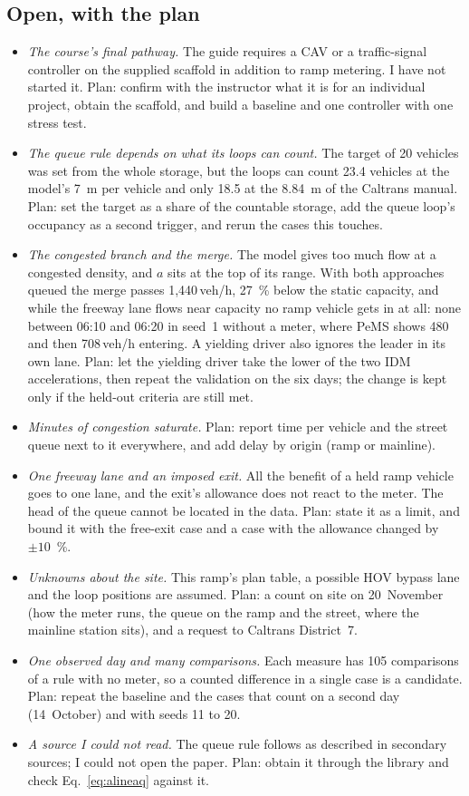 \documentclass[11pt,letterpaper]{article}
\newcommand{\vehh}{\,veh/h}
\begin{document}
\subsection{Open, with the plan}\label{sec:open}
\begin{itemize}
\item \emph{The course's final pathway.} The guide requires a CAV or a traffic-signal
  controller on the supplied scaffold in addition to ramp metering. I have not started
  it. Plan: confirm with the instructor what it is for an individual project, obtain the
  scaffold, and build a baseline and one controller with one stress test.
\item \emph{The queue rule depends on what its loops can count.} The target of 20
  vehicles was set from the whole storage, but the loops can count 23.4 vehicles at the
  model's 7~m per vehicle and only 18.5 at the 8.84~m of the Caltrans manual. Plan: set
  the target as a share of the countable storage, add the queue loop's occupancy as a
  second trigger, and rerun the cases this touches.
\item \emph{The congested branch and the merge.} The model gives too much flow at a
  congested density, and $a$ sits at the top of its range. With both approaches queued
  the merge passes 1{,}440\vehh{}, 27~\% below the static capacity, and while the
  freeway lane flows near capacity no ramp vehicle gets in at all: none between 06:10
  and 06:20 in seed~1 without a meter, where PeMS shows 480 and then 708\vehh{} entering.
  A yielding driver also ignores the leader in its own lane. Plan: let the yielding driver take the lower of the two IDM
  accelerations, then repeat the validation on the six days; the change is kept only if
  the held-out criteria are still met.
\item \emph{Minutes of congestion saturate.} Plan: report time per vehicle and the
  street queue next to it everywhere, and add delay by origin (ramp or mainline).
\item \emph{One freeway lane and an imposed exit.} All the benefit of a held ramp
  vehicle goes to one lane, and the exit's allowance does not react to the meter. The
  head of the queue cannot be located in the data. Plan: state it as a limit, and bound
  it with the free-exit case and a case with the allowance changed by $\pm10$~\%.
\item \emph{Unknowns about the site.} This ramp's plan table, a possible HOV bypass
  lane and the loop positions are assumed. Plan: a count on site on 20~November (how
  the meter runs, the queue on the ramp and the street, where the mainline station
  sits), and a request to Caltrans District~7.
\item \emph{One observed day and many comparisons.} Each measure has 105 comparisons of
  a rule with no meter, so a counted difference in a single case is a candidate. Plan:
  repeat the baseline and the cases that count on a second day (14~October) and with
  seeds 11 to 20.
\item \emph{A source I could not read.} The queue rule follows \cite{smaragdis2003} as
  described in secondary sources; I could not open the paper. Plan: obtain it through
  the library and check Eq.~\eqref{eq:alineaq} against it.
\end{itemize}
\end{document}
